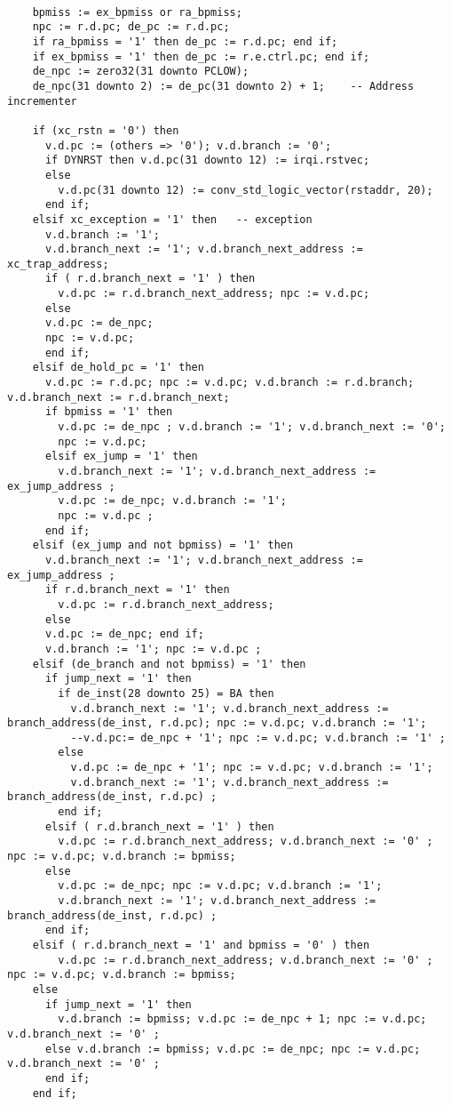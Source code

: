 \begin{lstlisting}

    bpmiss := ex_bpmiss or ra_bpmiss;
    npc := r.d.pc; de_pc := r.d.pc;
    if ra_bpmiss = '1' then de_pc := r.d.pc; end if;
    if ex_bpmiss = '1' then de_pc := r.e.ctrl.pc; end if;
    de_npc := zero32(31 downto PCLOW);
    de_npc(31 downto 2) := de_pc(31 downto 2) + 1;    -- Address incrementer

    if (xc_rstn = '0') then
      v.d.pc := (others => '0'); v.d.branch := '0';
      if DYNRST then v.d.pc(31 downto 12) := irqi.rstvec;
      else
        v.d.pc(31 downto 12) := conv_std_logic_vector(rstaddr, 20);
      end if;
    elsif xc_exception = '1' then	-- exception
      v.d.branch := '1';
      v.d.branch_next := '1'; v.d.branch_next_address := xc_trap_address;
      if ( r.d.branch_next = '1' ) then
      	v.d.pc := r.d.branch_next_address; npc := v.d.pc;
      else
      v.d.pc := de_npc;
      npc := v.d.pc;
      end if;
    elsif de_hold_pc = '1' then
      v.d.pc := r.d.pc; npc := v.d.pc; v.d.branch := r.d.branch; v.d.branch_next := r.d.branch_next;
      if bpmiss = '1' then
        v.d.pc := de_npc ; v.d.branch := '1'; v.d.branch_next := '0';
        npc := v.d.pc;
      elsif ex_jump = '1' then
        v.d.branch_next := '1'; v.d.branch_next_address := ex_jump_address ;
        v.d.pc := de_npc; v.d.branch := '1';
        npc := v.d.pc ;
      end if;    
    elsif (ex_jump and not bpmiss) = '1' then
      v.d.branch_next := '1'; v.d.branch_next_address := ex_jump_address ;
      if r.d.branch_next = '1' then
      	v.d.pc := r.d.branch_next_address;
      else
      v.d.pc := de_npc; end if; 
      v.d.branch := '1'; npc := v.d.pc ;
    elsif (de_branch and not bpmiss) = '1' then
      if jump_next = '1' then
        if de_inst(28 downto 25) = BA then
          v.d.branch_next := '1'; v.d.branch_next_address := branch_address(de_inst, r.d.pc); npc := v.d.pc; v.d.branch := '1';
          --v.d.pc:= de_npc + '1'; npc := v.d.pc; v.d.branch := '1'	;
        else
          v.d.pc := de_npc + '1'; npc := v.d.pc; v.d.branch := '1';
          v.d.branch_next := '1'; v.d.branch_next_address := branch_address(de_inst, r.d.pc) ;
        end if;
      elsif ( r.d.branch_next = '1' ) then
    	v.d.pc := r.d.branch_next_address; v.d.branch_next := '0' ; npc := v.d.pc; v.d.branch := bpmiss;
      else
        v.d.pc := de_npc; npc := v.d.pc; v.d.branch := '1';
        v.d.branch_next := '1'; v.d.branch_next_address := branch_address(de_inst, r.d.pc) ;
      end if;
    elsif ( r.d.branch_next = '1' and bpmiss = '0' ) then
    	v.d.pc := r.d.branch_next_address; v.d.branch_next := '0' ; npc := v.d.pc; v.d.branch := bpmiss;
    else
      if jump_next = '1' then
      	v.d.branch := bpmiss; v.d.pc := de_npc + 1; npc := v.d.pc; v.d.branch_next := '0' ;
      else v.d.branch := bpmiss; v.d.pc := de_npc; npc := v.d.pc; v.d.branch_next := '0' ;
      end if;	
    end if;
    

\end{lstlisting}

